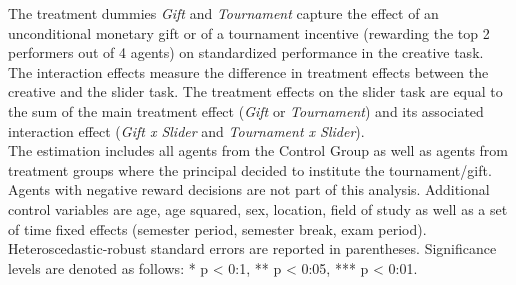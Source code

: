 \begin{table}[h]
\begin{center}
{\begin{minipage}{\textwidth}
The treatment dummies \textit{Gift} and \textit{Tournament} capture the effect of an unconditional monetary gift or of a tournament incentive (rewarding the top 2 performers out of 4 agents) on standardized performance in the creative task. 
The interaction effects measure the difference in treatment effects between the creative and the slider task. 
The treatment effects on the slider task are equal to the sum of the main treatment effect (\textit{Gift} or \textit{Tournament}) and its associated interaction effect (\textit{Gift x Slider} and \textit{Tournament x Slider}). \\
The estimation includes all agents from the Control Group as well as agents from treatment groups where the principal decided to institute the tournament/gift. Agents with negative reward decisions are not part of this analysis. 
Additional control variables are age, age squared, sex, location, field of study as well as a set of time fixed effects (semester period, semester break, exam period). 
Heteroscedastic-robust standard errors are reported in parentheses. Significance levels are denoted as follows: * p < 0:1, ** p < 0:05, *** p < 0:01. 
\end{minipage}}
\end{center}
\label{tab:EQ_Pooled_Results}
\end{table}
